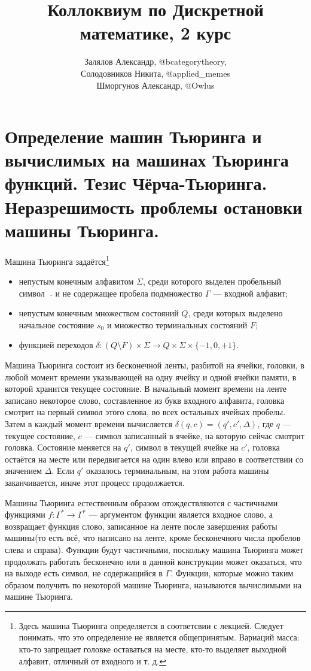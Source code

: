 \documentclass{article}
\title{Коллоквиум по Дискретной математике, 2 курс}
\author{Залялов Александр, @bcategorytheory,\\  Солодовников Никита, @applied\_memes \\ Шморгунов Александр, @Owlus }
\date{}
\begin{document}
\maketitle

\setcounter{section}{9}
\section{Определение машин Тьюринга и вычислимых на машинах Тьюринга функций. Тезис Чёрча-Тьюринга. Неразрешимость проблемы остановки машины Тьюринга.}
Машина Тьюринга задаётся\footnote{Здесь машина Тьюринга определяется в соответсвии с лекцией. Следует понимать, что это определение не является общепринятым. Вариаций масса: кто-то запрещает головке оставаться на месте, кто-то выделяет выходной алфавит, отличный от входного и т. д.}
\begin{itemize}
	\item непустым конечным алфавитом $\Sigma$, среди которого выделен пробельный символ $\vartextvisiblespace$ и не содержащее пробела подмножество $\Gamma$ --- входной алфавит;
	\item непустым конечным множеством состояний $Q$, среди которых выделено начальное состояние $s_0$ и множество терминальных состояний $F$;
	\item функцией переходов $\delta:(Q \setminus F) \times \Sigma \to Q \times \Sigma \times \{-1, 0, +1\}$.
\end{itemize}

Машина Тьюринга состоит из бесконечной ленты, разбитой на ячейки, головки, в любой момент времени указывающей на одну ячейку и одной ячейки памяти, в которой хранится текущее состояние. В начальный момент времени на ленте записано некоторое слово, составленное из букв входного алфавита, головка смотрит на первый символ этого слова, во всех остальных ячейках пробелы. Затем в каждый момент времени вычисляется $\delta(q, c) = (q', c', \Delta)$, где $q$ --- текущее состояние, $c$ --- символ записанный в ячейке, на которую сейчас смотрит головка. Состояние меняется на $q'$, символ в текущей ячейке на $c'$, головка остаётся на месте или передвигается на один влево или вправо в соответствии со значением $\Delta$. Если $q'$ оказалось терминальным, на этом работа машины заканчивается, иначе этот процесс продолжается.

Машины Тьюринга естественным образом отождествляются с частичными функциями $f:\Gamma^* \to \Gamma^*$ --- аргументом функции является входное слово, а возвращает функция слово, записанное на ленте после завершения работы машины(то есть всё, что написано на ленте, кроме бесконечного числа пробелов слева и справа). Функции будут частичными, поскольку машина Тьюринга может продолжать работать бесконечно или в данной конструкции может оказаться, что на выходе есть символ, не содержащийся в $\Gamma$. Функции, которые можно таким образом получить по некоторой машине Тьюринга, называются вычислимыми на машине Тьюринга.
\end{document}
